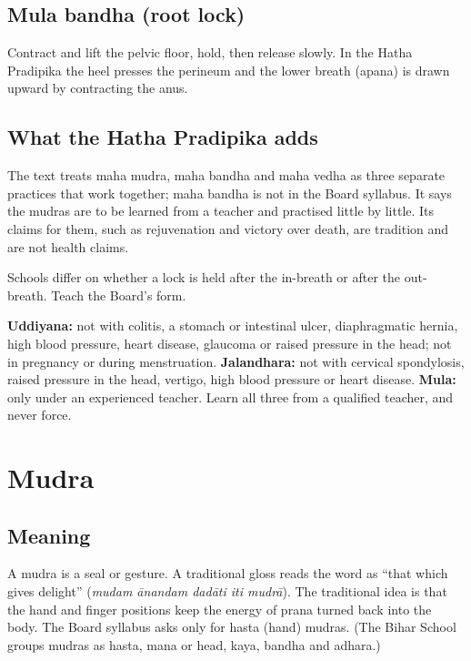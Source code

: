 \subsection*{Mula bandha (root lock)}
Contract and lift the pelvic floor, hold, then release slowly. In the Hatha Pradipika the heel presses the perineum and the lower breath (apana) is drawn upward by contracting the anus.

\subsection*{What the Hatha Pradipika adds}
The text treats maha mudra, maha bandha and maha vedha as three separate practices that work together; maha bandha is not in the Board syllabus. It says the mudras are to be learned from a teacher and practised little by little. Its claims for them, such as rejuvenation and victory over death, are tradition and are not health claims.

Schools differ on whether a lock is held after the in-breath or after the out-breath. Teach the Board's form.

\begin{caution}
\textbf{Uddiyana:} not with colitis, a stomach or intestinal ulcer, diaphragmatic hernia, high blood pressure, heart disease, glaucoma or raised pressure in the head; not in pregnancy or during menstruation.
\textbf{Jalandhara:} not with cervical spondylosis, raised pressure in the head, vertigo, high blood pressure or heart disease.
\textbf{Mula:} only under an experienced teacher.
Learn all three from a qualified teacher, and never force.
\end{caution}


\section{Mudra}

\subsection*{Meaning}
A mudra is a seal or gesture. A traditional gloss reads the word as ``that which gives delight'' (\emph{mudam ānandam dadāti iti mudrā}). The traditional idea is that the hand and finger positions keep the energy of prana turned back into the body. The Board syllabus asks only for hasta (hand) mudras. (The Bihar School groups mudras as hasta, mana or head, kaya, bandha and adhara.)

